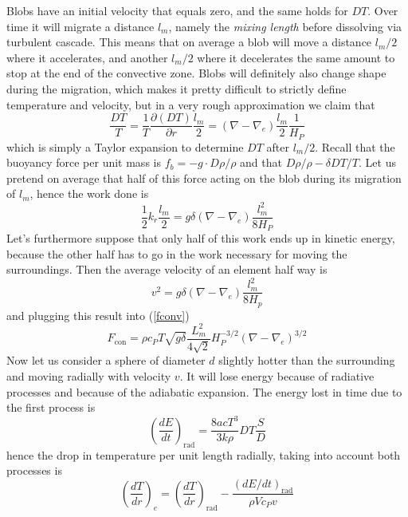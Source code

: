 Blobs have an initial velocity that equals zero, and the same holds for $DT$. Over time it will migrate a distance $l_m$, namely the \textit{mixing length} before dissolving via turbulent cascade. This means that on average a blob will move a distance $l_m/2$ where it accelerates, and another $l_m/2$ where it decelerates the same amount to stop at the end of the convective zone. Blobs will definitely also change shape during the migration, which makes it pretty difficult to strictly define temperature and velocity, but in a very rough approximation we claim that
\begin{equation}
	\frac{DT}{T}=\frac{1}{T}\frac{\partial (DT)}{\partial r} \frac{l_m}{2}=(\nabla-\nabla_e)\frac{l_m}{2}\frac{1}{H_P}
\end{equation}
which is simply a Taylor expansion to determine $DT$ after $l_m/2$. Recall that the buoyancy force per unit mass is $f_b=-g \cdot D \rho / \rho$ and that $D \rho / \rho - \delta D T / T$. Let us pretend on average that half of this force acting on the blob during its migration of $l_m$, hence the work done is
\begin{equation}\label{7.6}
	\frac{1}{2} k_r \frac{l_m}{2}=g \delta (\nabla - \nabla_e)\frac{l_m^2}{8 H_P}
\end{equation}
Let's furthermore suppose that only half of this work ends up in kinetic energy, because the other half has to go in the work necessary for moving the surroundings. Then the average velocity of an element half way is
\begin{equation}
	v^2=g \delta (\nabla - \nabla_e)\frac{l_m^2}{8 H_p}
\end{equation}
and plugging this result into (\ref{fconv})
\begin{equation}
F_{\mathrm{con}}= \rho c_P T \sqrt{g \delta} \frac{L^2_m}{4\sqrt{2}}H_P^{-3/2} (\nabla-\nabla_e)^{3/2}
\end{equation}
Now let us consider a sphere of diameter $d$ slightly hotter than the surrounding and moving radially with velocity $v$. It will lose energy because of radiative processes and because of the adiabatic expansion. The energy lost in time due to the first process is
\begin{equation}
\left (\frac{d E}{d t}  \right )_{\mathrm{rad}} = \frac{8 a c T^3}{3 k \rho} DT \frac{S}{D}
\end{equation}
hence the drop in temperature per unit length radially, taking into account both processes is
\begin{equation}\label{7.7}
	\left (  \frac{d T}{d r }   \right )_e = \left(  \frac{dT}{d r }   \right )_{\mathrm{rad}} - \frac{\left( d E / dt \right)_{\mathrm{rad}} }{\rho V c_P v}
\end{equation}
